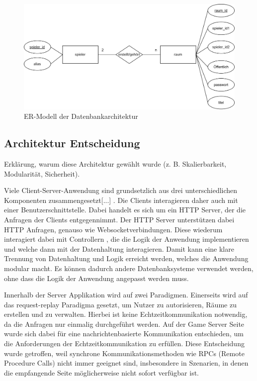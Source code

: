 \documentclass[
]{article}
\begin{document}
\begin{figure}[H]
	\centering
	\includegraphics[width=\textwidth ]{resources/ER-Modell.png}
	\caption{ER-Modell der Datenbankarchitektur}
	\label{fig:ER-Modell}
\end{figure}









\hypertarget{section-achitactural-decision}{%
\subsection{Architektur Entscheidung}}
Erklärung, warum diese Architektur gewählt wurde (z. B. Skalierbarkeit, Modularität, Sicherheit).

\glqq Viele Client-Server-Anwendung sind grundsetzlich aus drei unterschiedlichen Komponenten zusammengesetzt[...]\grqq{} \cite[S.57 ff.]{tanenbaum2007distributed}.
Die Clients interagieren daher auch mit einer Benutzerschnittstelle. Dabei handelt es sich um ein HTTP Server, der die Anfragen der Clients entgegennimmt.
Der HTTP Server unterstützen dabei HTTP Anfragen, genauso wie Websocketverbindungen.
Diese wiederum interagiert dabei mit \glqq Controllern \grqq{}, die die Logik der Anwendung implementieren und welche dann
mit der Datenhaltung interagieren. Damit kann eine klare Trennung von Datenhaltung und Logik erreicht werden, welches die Anwendung
modular macht. Es können dadurch andere Datenbanksysteme verwendet werden, ohne dass die Logik der Anwendung angepasst werden muss.

Innerhalb der Server Applikation wird auf zwei Paradigmen.
Einerseits wird auf das request-replay Paradigma gesetzt, um Nutzer zu autorisieren, Räume zu erstellen und zu verwalten.
Hierbei ist keine Echtzeitkommunikation notwendig, da die Anfragen nur einmalig durchgeführt werden.
Auf der Game Server Seite wurde sich dabei für eine nachrichtenbasierte Kommunikation entschieden, 
um die Anforderungen der Echtzeitkommunikation zu erfüllen. Diese Entscheidung wurde getroffen, 
weil synchrone Kommunikationsmethoden wie RPCs (Remote Procedure Calls) nicht immer geeignet 
sind, insbesondere in Szenarien, in denen die empfangende Seite möglicherweise nicht sofort 
verfügbar ist. 
\end{document}

